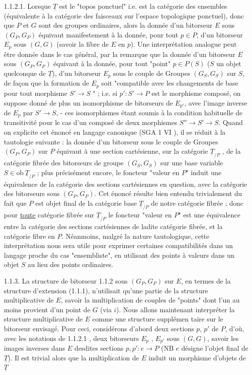 1.1.2.1.  Lorsque $\underline{T}$ est le "topos ponctuel" i.e. est la catégorie des ensembles (équivalente à la catégorie des faisceaux sur l'espace topologique ponctuel), donc que $P$ et $G$ sont des groupes ordinaires, alors la donnée d'un bitorseur $E$ sous  $(G_P,G_P)$  équivaut manifestement à la donnée, pour tout $p \in P$, d'un bitorseur $E_p$ sous $(G,G)$ (savoir la fibre de $E$ en $p$). Une interprétation analogue peut être donnée dans le cas général, par la remarque que la donnée d'un bitorseur $E$ sous $(G_P,G_P)$ équivaut à la donnée, pour tout "point" $p \in P(S)$ ($S$ un objet quelconque de $\underline{T}$), d'un bitorseur $E_p$ sous
le couple de Groupes $(G_S,G_S)$ sur $S$, de façon que la formation de $E_p$ soit "compatible avec les changements de base pour tout morphisme $S' \longrightarrow S$ " ; i.e. si $p' : S' \longrightarrow P$ est le morphisme composé, on suppose donné de plus un isomorphisme de bitorseurs de $E_{p'}$, avec l'image inverse de $E_p$ par $S' \longrightarrow S$, - ces isomorphismes étant soumis à la condition habituelle de transitivité pour le cas d'un composé de deux morphismes $S'' \longrightarrow S' \longrightarrow S$. Quand on explicite cet énoncé en langage canonique (SGA 1 VI    ), il se réduit à la tautologie suivante : la donnée d'un bitorseur sous le couple de Groupes $(G_P,G_P)$ sur $P$ équivaut à une section cartésienne, sur la catégorie $\underline{T}_{/P}$ , de la catégorie fibrée des bitorseurs de groupe $(G_S,G_S)$ sur une base variable $S \in \mathrm{ob}\ \underline{T}_{/P}$ ; plus précisément encore, le foncteur "valeur en $P$" induit une équivalence de la catégorie des sections cartésiennes en question, avec la catégorie des bitorseurs sous $(G_P,G_P)$. Cet énoncé résulte bien entendu trivialement du fait que $P$ est objet final de la catégorie base $\underline{T}_{/P}$ de notre catégorie fibrée ; donc pour \underline{toute} catégorie fibrée sur $\underline{T}_{/P}$ le foncteur "valeur en $P$" est une équivalence entre la catégorie des sections cartésiennes de ladite catégorie fibrée, et la catégorie fibre en $P$. Néanmoins, malgré la nature tautologique, cette interprétation nous sera utile pour exprimer certaines compatibilités dans un langage proche du cas "ensembliste", en utilisant des points à valeurs dans un objet $S$ au lieu des points ordinaires.

1.1.3.  La structure de bitorseur 1.1.2 sous $(G_P,G_P)$ sur $E$, en termes de la structure d'extension (1.1.1), n'utilisait qu'une partie de la structure multiplicative de $E$, savoir la multiplication de couples de "points" dont l'un au moins provient d'un point de $G$ (via $i$). Nous allons maintenant interpréter la structure multiplicative de $E$ comme une structure supplémen
taire sur le bitorseur envisagé. Pour ceci, considérons d'abord deux sections $p$, $p'$ de $P$, d'où, avec les notations de 1.1.2.1 , deux bitorseurs $E_p$ , $E_{p'}$ sous $(G,G)$, savoir les images inverses dans $E$ desdites sections $p,p' : e \longrightarrow P$ (NB $e$ désigne l'objet final de $\underline{T}$). Il est trivial alors que la multiplication de $E$ induit un morphisme d'objets de $\underline{T}$

